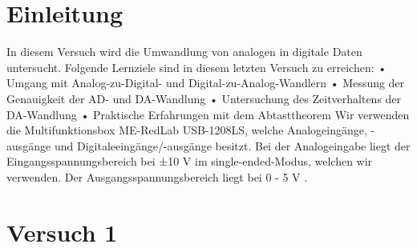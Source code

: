 \documentclass[12pt, oneside, a4paper, \docLanguage]{report}
\begin{document}

\setcounter{section}{0}



\clearpage

%
%


%
%


%
%
%

%
%




\setcounter{page}{1}
\pagestyle{default}
%
%
\chapter{Einleitung}
\label{chap:EINL}
\begin{normalsize}
In diesem Versuch wird die Umwandlung von analogen in digitale Daten untersucht. Folgende Lernziele sind in diesem letzten Versuch zu erreichen:\newline
• Umgang mit Analog-zu-Digital- und Digital-zu-Analog-Wandlern\newline
• Messung der Genauigkeit der AD- und DA-Wandlung\newline
• Untersuchung des Zeitverhaltens der DA-Wandlung\newline
• Praktische Erfahrungen mit dem Abtasttheorem\newline
Wir verwenden die Multifunktionsbox ME-RedLab USB-1208LS, welche Analogeingänge, -ausgänge und Digitaleeingänge/-ausgänge besitzt.
Bei der Analogeingabe liegt der Eingangsspannungsbereich bei ±10 V im single-ended-Modus, welchen wir verwenden. Der Ausgangsspannungsbereich liegt bei 0 - 5 V .
\end{normalsize}

%
%
\chapter{Versuch 1}
\label{chap:VERSUCH_1}
\end{document}
